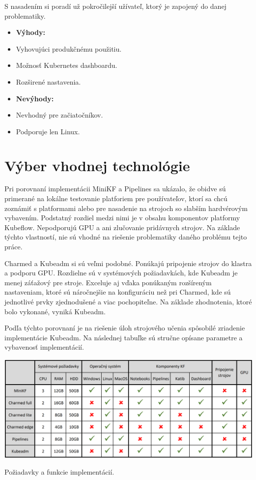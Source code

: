 S nasadením si poradí už pokročilejší užívateľ, ktorý je zapojený do danej problematiky.
\newline
\newline
\begin{minipage}[t]{.55\textwidth}
    \begin{itemize}
        \item []\textbf{Výhody:}
        \item Vyhovujúci produkčnému použitiu.
	    \item Možnosť Kubernetes dashboardu.
        \item Rozširené nastavenia.
    \end{itemize}
\end{minipage}%
\begin{minipage}[t]{.45\textwidth}
    \begin{itemize}
        \item []\textbf{Nevýhody:}
        \item Nevhodný pre začiatočníkov.
	    \item Podporuje len Linux.
    \end{itemize}
\end{minipage}

\section{Výber vhodnej technológie}

Pri porovnaní implementácii MiniKF a Pipelines sa ukázalo, že obidve sú primerané na lokálne testovanie platforiem pre používateľov, ktorí sa chcú zoznámiť s platformami alebo pre nasadenie na strojoch so slabším hardvérovým vybavením. Podstatný rozdiel medzi nimi je v obsahu komponentov platformy Kubeflow. Nepodporujú GPU a ani zlučovanie pridávnych strojov. Na základe týchto vlastností, nie sú vhodné na riešenie problematiky daného problému tejto práce.

Charmed a Kubeadm si sú veľmi podobné. Ponúkajú pripojenie strojov do klastra a podporu GPU. Rozdielne sú v systémových požiadavkách, kde Kubeadm je menej záťažový pre stroje. Exceluje aj vďaka ponúkaným rozšíreným nastaveniam, ktoré sú náročnejšie na konfiguráciu než pri Charmed, kde sú jednotlivé prvky zjednodušené a viac pochopiteľne. Na základe zhodnotenia, ktoré bolo vykonané, vyniká Kubeadm.

Podľa týchto porovnaní je na riešenie úloh strojového učenia spôsobilé zriadenie implementácie Kubeadm. Na následnej tabuľke sú stručne opísane parametre a vybavenosť implementácií.

\begin{table}[!h]
    \centering
    \includegraphics[width=1\linewidth]{figures/table}
    \caption{Požiadavky a funkcie implementácií.}
\end{table}